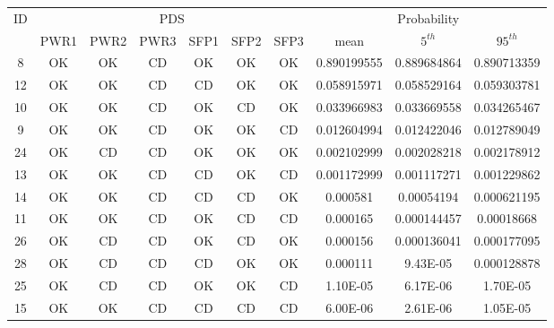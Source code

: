 \begin{table}
  \centering
  \begin{tabular}{c|cccccc|ccc}
    \hline
    ID & \multicolumn{6}{c}{PDS} & \multicolumn{3}{c}{Probability}   \\
    \cline{2-10}
         & PWR1 & PWR2 & PWR3 & SFP1 & SFP2 & SFP3 & mean & $5^{th}$ & $95^{th}$     \\
    \hline \hline
     8    & OK   & OK   & \cellcolor[gray]{0.95}CD   & OK   & OK   & OK   & 0.890199555 & 0.889684864 & 0.890713359 \\
      12   & OK   & OK   & \cellcolor[gray]{0.95}CD   & \cellcolor[gray]{0.95}CD   & OK   & OK   & 0.058915971 & 0.058529164 & 0.059303781 \\
      10   & OK   & OK   & \cellcolor[gray]{0.95}CD   & OK   & \cellcolor[gray]{0.95}CD   & OK   & 0.033966983 & 0.033669558 & 0.034265467 \\
      9    & OK   & OK   & \cellcolor[gray]{0.95}CD   & OK   & OK   & \cellcolor[gray]{0.95}CD   & 0.012604994 & 0.012422046 & 0.012789049 \\
      24   & OK   & \cellcolor[gray]{0.95}CD   & \cellcolor[gray]{0.95}CD   & OK   & OK   & OK   & 0.002102999 & 0.002028218 & 0.002178912 \\ 
      13   & OK   & OK   & \cellcolor[gray]{0.95}CD   & \cellcolor[gray]{0.95}CD   & OK   & \cellcolor[gray]{0.95}CD   & 0.001172999 & 0.001117271 & 0.001229862 \\
      14   & OK   & OK   & \cellcolor[gray]{0.95}CD   & \cellcolor[gray]{0.95}CD   & \cellcolor[gray]{0.95}CD   & OK   & 0.000581    & 0.00054194  & 0.000621195 \\    
      11   & OK   & OK   & \cellcolor[gray]{0.95}CD   & OK   & \cellcolor[gray]{0.95}CD   & \cellcolor[gray]{0.95}CD   & 0.000165    & 0.000144457 & 0.00018668  \\     
      26   & OK   & \cellcolor[gray]{0.95}CD   & \cellcolor[gray]{0.95}CD   & OK   & \cellcolor[gray]{0.95}CD   & OK   & 0.000156    & 0.000136041 & 0.000177095 \\
      28   & OK   & \cellcolor[gray]{0.95}CD   & \cellcolor[gray]{0.95}CD   & \cellcolor[gray]{0.95}CD   & OK   & OK   & 0.000111    & 9.43E-05    & 0.000128878 \\
      25   & OK   & \cellcolor[gray]{0.95}CD   & \cellcolor[gray]{0.95}CD   & OK   & OK   & \cellcolor[gray]{0.95}CD   & 1.10E-05    & 6.17E-06    & 1.70E-05    \\ 
     15   & OK   & OK   & \cellcolor[gray]{0.95}CD   & \cellcolor[gray]{0.95}CD   & \cellcolor[gray]{0.95}CD   & \cellcolor[gray]{0.95}CD   & 6.00E-06    & 2.61E-06    & 1.05E-05    \\     

\end{tabular}
\end{table}
